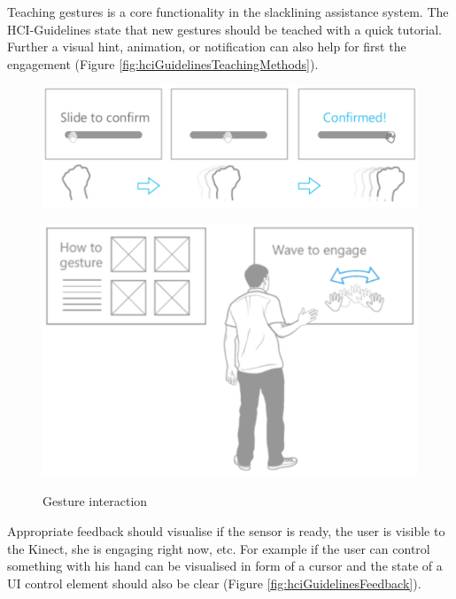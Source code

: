 Teaching gestures is a core functionality in the slacklining assistance system. The HCI-Guidelines state that new gestures should be teached with a quick tutorial. Further a visual hint, animation, or notification can also help for first the engagement (Figure \ref{fig:hciGuidelinesTeachingMethods}).
\begin{figure}[htb]
	\centering
	\begin{minipage}[t]{0.45\linewidth}
		\centering
		\includegraphics[width=1\linewidth]{Pictures/hciGuidelinesDynamicGesture}
		\label{fig:hciGuidelinesDynamicGesture}
	\end{minipage}
	\hfill
	\begin{minipage}[t]{0.45\linewidth}
		\centering
		\includegraphics[width=0.8\linewidth]{Pictures/hciGuidelinesTeachingMethods}
		\label{fig:hciGuidelinesTeachingMethods}
	\end{minipage}
	\caption{Gesture interaction~\cite{MicrosoftHIG2014-mh}}
	\label{fig:hciGuidelinesMicrosoft}
\end{figure}

Appropriate feedback should visualise if the sensor is ready, the user is visible to the Kinect, she is engaging right now, etc. For example if the user can control something with his hand can be visualised in form of a cursor and the state of a UI control element should also be clear (Figure \ref{fig:hciGuidelinesFeedback}).

